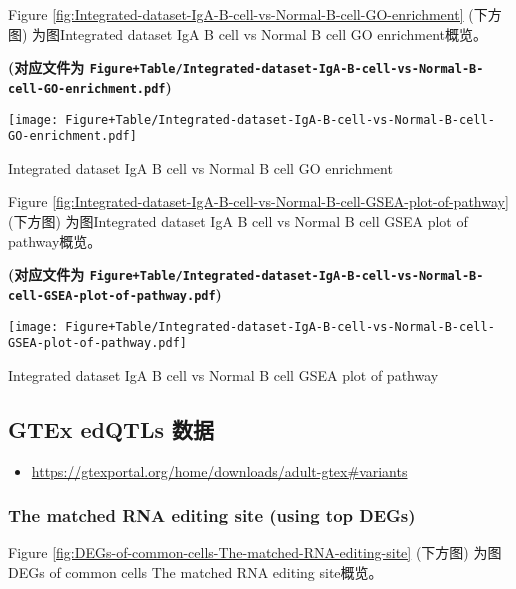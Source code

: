 \documentclass[
]{article}
\providecommand{\tightlist}{%
  \setlength{\itemsep}{0pt}\setlength{\parskip}{0pt}}
\begin{document}
Figure \ref{fig:Integrated-dataset-IgA-B-cell-vs-Normal-B-cell-GO-enrichment} (下方图) 为图Integrated dataset IgA B cell vs Normal B cell GO enrichment概览。

\textbf{(对应文件为 \texttt{Figure+Table/Integrated-dataset-IgA-B-cell-vs-Normal-B-cell-GO-enrichment.pdf})}

\def\@captype{figure}
\begin{center}
\texttt{[image: Figure+Table/Integrated-dataset-IgA-B-cell-vs-Normal-B-cell-GO-enrichment.pdf]}
\caption{Integrated dataset IgA B cell vs Normal B cell GO enrichment}\label{fig:Integrated-dataset-IgA-B-cell-vs-Normal-B-cell-GO-enrichment}
\end{center}

Figure \ref{fig:Integrated-dataset-IgA-B-cell-vs-Normal-B-cell-GSEA-plot-of-pathway} (下方图) 为图Integrated dataset IgA B cell vs Normal B cell GSEA plot of pathway概览。

\textbf{(对应文件为 \texttt{Figure+Table/Integrated-dataset-IgA-B-cell-vs-Normal-B-cell-GSEA-plot-of-pathway.pdf})}

\def\@captype{figure}
\begin{center}
\texttt{[image: Figure+Table/Integrated-dataset-IgA-B-cell-vs-Normal-B-cell-GSEA-plot-of-pathway.pdf]}
\caption{Integrated dataset IgA B cell vs Normal B cell GSEA plot of pathway}\label{fig:Integrated-dataset-IgA-B-cell-vs-Normal-B-cell-GSEA-plot-of-pathway}
\end{center}

\hypertarget{gtex-edqtls-ux6570ux636e}{%
\subsection{GTEx edQTLs 数据}\label{gtex-edqtls-ux6570ux636e}}

\begin{itemize}
\tightlist
\item
  \url{https://gtexportal.org/home/downloads/adult-gtex\#variants}
\end{itemize}

\hypertarget{the-matched-rna-editing-site-using-top-degs}{%
\subsubsection{The matched RNA editing site (using top DEGs)}\label{the-matched-rna-editing-site-using-top-degs}}

Figure \ref{fig:DEGs-of-common-cells-The-matched-RNA-editing-site} (下方图) 为图DEGs of common cells The matched RNA editing site概览。
\end{document}
